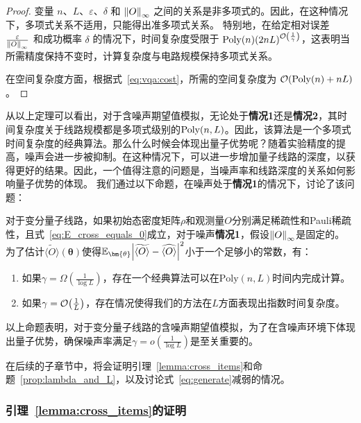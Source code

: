 \begin{proof}
变量 $n$、$L$、$\varepsilon$、$\delta$ 和 $\norm{O}_\infty$ 之间的关系是非多项式的。因此，在这种情况下，多项式关系不适用，只能得出准多项式关系。
特别地，在给定相对误差 $\frac{\varepsilon}{\norm{O}_\infty}$ 和成功概率 $\delta$ 的情况下，时间复杂度受限于 $\mathrm{Poly}(n)  (2nL)^{\order{\frac{1}{\gamma}}}$，这表明当所需精度保持不变时，计算复杂度与电路规模保持多项式关系。

在空间复杂度方面，根据式~\eqref{eq:vqa:cost}，所需的空间复杂度为 $\order{\mathrm{Poly}(n)+nL}$。
\end{proof}

\begin{remark}
    从以上定理可以看出，对于含噪声期望值模拟，无论处于\textbf{情况1}还是\textbf{情况2}，其时间复杂度关于线路规模都是多项式级别的$\text{Poly}(n,L)$。因此，该算法是一个多项式时间复杂度的经典算法。那么什么时候会体现出量子优势呢？随着实验精度的提高，噪声会进一步被抑制。在这种情况下，可以进一步增加量子线路的深度，以获得更好的结果。因此，一个值得注意的问题是，当噪声率和线路深度的关系如何影响量子优势的体现。
    我们通过以下命题，在噪声处于\textbf{情况1}的情况下，讨论了该问题：
\end{remark}
\begin{proposition}
    \label{prop:lambda_and_L}
    对于变分量子线路，如果初始态密度矩阵$\rho$和观测量$O$分别满足稀疏性和Pauli稀疏性，且式~\eqref{eq:E_cross_equals_0}成立，对于噪声\textbf{情况1}，假设$\norm{O}_\infty$是固定的。
    为了估计$\widetilde{\langle O\rangle}(\bm{\theta})$使得$\mathbb{E}_{\bm{\theta}}\abs{\widetilde{\langle O\rangle}-\widehat{\langle O\rangle}}^2$小于一个足够小的常数，有：
    \begin{enumerate}
        \item 如果$\gamma=\Omega(\frac{1}{\log{L}})$，存在一个经典算法可以在$\mathrm{Poly}\left(n,L\right)$时间内完成计算。
        \item 如果$\gamma=\order{\frac{1}{L}}$，存在情况使得我们的方法在$L$方面表现出指数时间复杂度。
    \end{enumerate}
\end{proposition}
以上命题表明，对于变分量子线路的含噪声期望值模拟，为了在含噪声环境下体现出量子优势，确保噪声率满足$\gamma=o(\frac{1}{\log{L}})$是至关重要的。

在后续的子章节中，将会证明引理~\ref{lemma:cross_items}和命题~\ref{prop:lambda_and_L}，以及讨论式~\eqref{eq:generate}减弱的情况。

\subsubsection{引理~\ref{lemma:cross_items}的证明}\label{temp:subsubsection:cross_items}